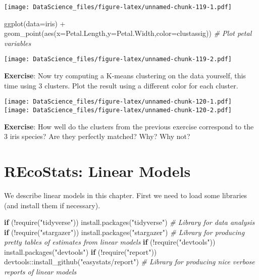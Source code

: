 \documentclass[
]{book}
\newenvironment{Shaded}{\begin{snugshade}}{\end{snugshade}}
\newcommand{\AttributeTok}[1]{\textcolor[rgb]{0.77,0.63,0.00}{#1}}
\newcommand{\CommentTok}[1]{\textcolor[rgb]{0.56,0.35,0.01}{\textit{#1}}}
\newcommand{\ControlFlowTok}[1]{\textcolor[rgb]{0.13,0.29,0.53}{\textbf{#1}}}
\newcommand{\FunctionTok}[1]{\textcolor[rgb]{0.00,0.00,0.00}{#1}}
\newcommand{\NormalTok}[1]{#1}
\newcommand{\SpecialCharTok}[1]{\textcolor[rgb]{0.00,0.00,0.00}{#1}}
\newcommand{\StringTok}[1]{\textcolor[rgb]{0.31,0.60,0.02}{#1}}
\begin{document}
\texttt{[image: DataScience\_files/figure-latex/unnamed-chunk-119-1.pdf]}

\begin{Shaded}
\begin{Highlighting}[]
\FunctionTok{ggplot}\NormalTok{(}\AttributeTok{data=}\NormalTok{iris) }\SpecialCharTok{+} \FunctionTok{geom\_point}\NormalTok{(}\FunctionTok{aes}\NormalTok{(}\AttributeTok{x=}\NormalTok{Petal.Length,}\AttributeTok{y=}\NormalTok{Petal.Width,}\AttributeTok{color=}\NormalTok{clustassig)) }\CommentTok{\# Plot petal variables}
\end{Highlighting}
\end{Shaded}

\texttt{[image: DataScience\_files/figure-latex/unnamed-chunk-119-2.pdf]}

\textbf{Exercise}: Now try computing a K-means clustering on the data yourself, this time using 3 clusters. Plot the result using a different color for each cluster.

\texttt{[image: DataScience\_files/figure-latex/unnamed-chunk-120-1.pdf]} \texttt{[image: DataScience\_files/figure-latex/unnamed-chunk-120-2.pdf]}

\textbf{Exercise}: How well do the clusters from the previous exercise correspond to the 3 iris species? Are they perfectly matched? Why? Why not?

\hypertarget{recostats-linear-models}{%
\chapter{REcoStats: Linear Models}\label{recostats-linear-models}}

We describe linear models in this chapter. First we need to load some libraries (and install them if necessary).

\begin{Shaded}
\begin{Highlighting}[]
\ControlFlowTok{if}\NormalTok{ (}\SpecialCharTok{!}\FunctionTok{require}\NormalTok{(}\StringTok{"tidyverse"}\NormalTok{)) }\FunctionTok{install.packages}\NormalTok{(}\StringTok{"tidyverse"}\NormalTok{) }\CommentTok{\# Library for data analysis}
\ControlFlowTok{if}\NormalTok{ (}\SpecialCharTok{!}\FunctionTok{require}\NormalTok{(}\StringTok{"stargazer"}\NormalTok{)) }\FunctionTok{install.packages}\NormalTok{(}\StringTok{"stargazer"}\NormalTok{) }\CommentTok{\# Library for producing pretty tables of estimates from linear models}
\ControlFlowTok{if}\NormalTok{ (}\SpecialCharTok{!}\FunctionTok{require}\NormalTok{(}\StringTok{"devtools"}\NormalTok{)) }\FunctionTok{install.packages}\NormalTok{(}\StringTok{"devtools"}\NormalTok{)}
\ControlFlowTok{if}\NormalTok{ (}\SpecialCharTok{!}\FunctionTok{require}\NormalTok{(}\StringTok{"report"}\NormalTok{)) devtools}\SpecialCharTok{::}\FunctionTok{install\_github}\NormalTok{(}\StringTok{"easystats/report"}\NormalTok{) }\CommentTok{\# Library for producing nice verbose reports of linear models}
\end{Highlighting}
\end{Shaded}
\end{document}
